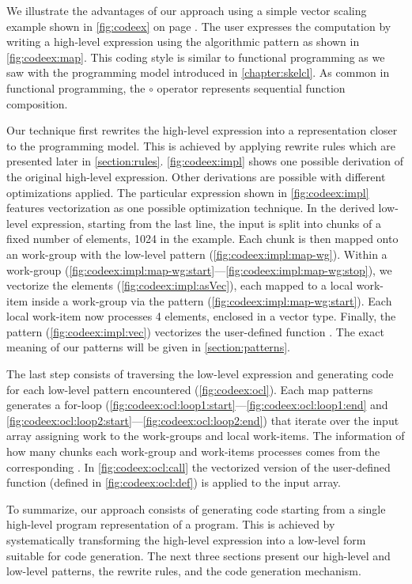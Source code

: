 We illustrate the advantages of our approach using a simple vector scaling example shown in \autoref{fig:codeex} on page \pageref{fig:codeex}.
The user expresses the computation by writing a high-level expression using the algorithmic  pattern as shown in \autoref{fig:codeex:map}.
This coding style is similar to functional programming as we saw with the \SkelCL programming model introduced in \autoref{chapter:skelcl}.
As common in functional programming, the $\circ$ operator represents sequential function composition. %

Our technique first rewrites the high-level expression into a representation closer to the \OpenCL programming model.
This is achieved by applying rewrite rules which are presented later in \autoref{section:rules}.
\autoref{fig:codeex:impl} shows one possible derivation of the original high-level expression.
Other derivations are possible with different optimizations applied.
The particular expression shown in \autoref{fig:codeex:impl} features vectorization as one possible optimization technique.
In the derived low-level expression, starting from the last line, the input is split into chunks of a fixed number of elements, 1024 in the example.
Each chunk is then mapped onto an \OpenCL work-group with the  low-level pattern (\autoref{fig:codeex:impl:map-wg}).
Within a work-group (\autoref{fig:codeex:impl:map-wg:start}---\autoref{fig:codeex:impl:map-wg:stop}), we vectorize the elements (\autoref{fig:codeex:impl:asVec}), each mapped to a local work-item inside a work-group via the  pattern (\autoref{fig:codeex:impl:map-wg:start}).
Each local work-item now processes 4 elements, enclosed in a vector type.
Finally, the  pattern (\autoref{fig:codeex:impl:vec}) vectorizes the user-defined function .
The exact meaning of our patterns will be given in \autoref{section:patterns}.

The last step consists of traversing the low-level expression and generating \OpenCL code for each low-level pattern encountered (\autoref{fig:codeex:ocl}).
Each map patterns generates a for-loop (\autoref{fig:codeex:ocl:loop1:start}---\autoref{fig:codeex:ocl:loop1:end} and \autoref{fig:codeex:ocl:loop2:start}---\autoref{fig:codeex:ocl:loop2:end}) that iterate over the input array assigning work to the work-groups and local work-items.
The information of how many chunks each work-group and work-items processes comes from the corresponding .
In \autoref{fig:codeex:ocl:call} the vectorized version of the user-defined  function (defined in \autoref{fig:codeex:ocl:def}) is applied to the input array.

To summarize, our approach consists of generating \OpenCL code starting from a single high-level program representation of a program.
This is achieved by systematically transforming the high-level expression into a low-level form suitable for code generation.
The next three sections present our high-level and low-level patterns, the rewrite rules, and the code generation mechanism.

